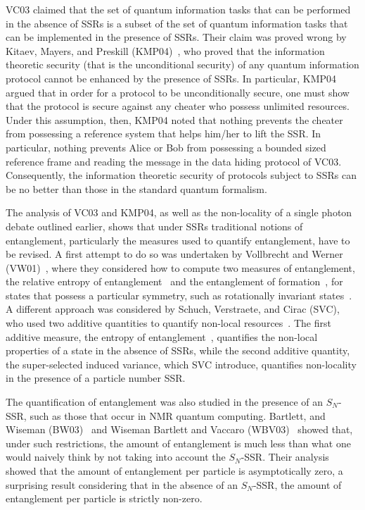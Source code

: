 VC03 claimed that the set of quantum information tasks that can be performed in the absence of SSRs is a subset of the set of quantum information tasks that can be implemented in the presence of SSRs. Their claim was proved wrong by Kitaev, Mayers, and Preskill (KMP04)~\cite{KMP04}, who proved that the information theoretic security (that is the unconditional security) of any quantum information protocol cannot be enhanced by the presence of SSRs.  In particular, KMP04 argued that in order for a protocol to be unconditionally secure, one must show that the protocol is secure against any cheater who possess unlimited resources.  Under this assumption, then, KMP04 noted that nothing prevents the cheater from possessing a reference system that helps him/her to lift the SSR. In particular, nothing prevents Alice or Bob from possessing a bounded sized reference frame and reading the message in the data hiding protocol of VC03. Consequently, the information theoretic security of protocols subject to SSRs can be no better than those in the standard quantum formalism. 

The analysis of VC03 and KMP04, as well as the non-locality of a single photon debate outlined earlier, shows that under SSRs traditional notions of entanglement, particularly the measures used to quantify entanglement, have to be revised. A first attempt to do so was undertaken by Vollbrecht and Werner (VW01)~\cite{VW01}, where they considered how to compute two measures of entanglement, the relative entropy of entanglement~\cite{VPRK97} and the entanglement of formation~\cite{BDSW96}, for states that possess a particular symmetry, such as rotationally invariant states~\cite{W89}.  A different approach was considered by Schuch, Verstraete, and Cirac (SVC), who used two additive quantities to quantify non-local resources~\cite{SVC04a, SVC04b}. The first additive measure, the entropy of entanglement~\cite{BBPS96}, quantifies the non-local properties of a state in the absence of SSRs, while the second additive quantity, the super-selected induced variance, which SVC introduce, quantifies non-locality in the presence of a particle number SSR. 

The quantification of entanglement was also studied in the presence of an $S_N$-SSR, such as those that occur in NMR quantum computing. Bartlett, and Wiseman (BW03)~\cite{BW03} and Wiseman Bartlett and Vaccaro (WBV03)~\cite{WBV03} showed that, under such restrictions, the amount of entanglement is much less than what one would naively think by not taking into account the $S_N$-SSR.  Their analysis showed that the amount of entanglement per particle is asymptotically zero, a surprising result considering that in the absence of  an $S_N$-SSR, the amount of entanglement per particle is strictly non-zero.

